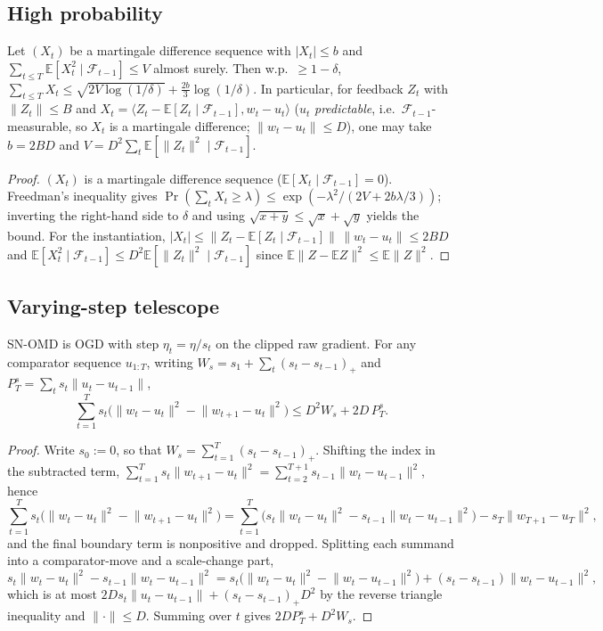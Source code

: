 \documentclass{article}
\newcommand{\E}{\mathbb{E}}
\newcommand{\ip}[2]{\langle #1, #2 \rangle}
\newcommand{\norm}[1]{\lVert #1 \rVert}
\begin{document}
\subsection{High probability}
\begin{lemma}
\label{lem:freedman}
Let $(X_t)$ be a martingale difference sequence with $|X_t|\le b$ and
$\sum_{t\le T}\E[X_t^2\mid\mathcal F_{t-1}]\le V$ almost surely. Then w.p.\ $\ge1-\delta$,
$\sum_{t\le T}X_t\le\sqrt{2V\log(1/\delta)}+\tfrac{2b}{3}\log(1/\delta)$. In particular,
for feedback $Z_t$ with $\norm{Z_t}\le B$ and $X_t=\ip{Z_t-\E[Z_t\mid\mathcal F_{t-1}]}
{w_t-u_t}$ ($u_t$ \emph{predictable}, i.e.\ $\mathcal F_{t-1}$-measurable, so $X_t$ is a
martingale difference; $\norm{w_t-u_t}\le D$), one may take $b=2BD$ and
$V=D^2\sum_t\E[\norm{Z_t}^2\mid\mathcal F_{t-1}]$.
\end{lemma}
\begin{proof}

$(X_t)$ is a martingale difference sequence ($\E[X_t\mid\mathcal F_{t-1}]=0$).
Freedman's inequality gives $\Pr(\sum_t X_t\ge\lambda)\le\exp(-\lambda^2/(2V+2b\lambda/3))$;
inverting the right-hand side to $\delta$ and using $\sqrt{x+y}\le\sqrt x+\sqrt y$ yields
the bound. For the instantiation, $|X_t|\le\norm{Z_t-\E[Z_t\mid\mathcal F_{t-1}]}\,
\norm{w_t-u_t}\le2BD$ and $\E[X_t^2\mid\mathcal F_{t-1}]\le D^2\E[\norm{Z_t}^2\mid
\mathcal F_{t-1}]$ since $\E\norm{Z-\E Z}^2\le\E\norm Z^2$.
\end{proof}

\subsection{Varying-step telescope}
\begin{lemma}
\label{lem:telescope}
SN-OMD is OGD with step $\eta_t=\eta/s_t$ on the clipped raw gradient. For any
comparator sequence $u_{1:T}$, writing $W_s=s_1+\sum_t(s_t-s_{t-1})_+$ and
$P_T^s=\sum_t s_t\norm{u_t-u_{t-1}}$,
\[
\sum_{t=1}^T s_t\bigl(\norm{w_t-u_t}^2-\norm{w_{t+1}-u_t}^2\bigr)\le D^2W_s+2D\,P_T^s.
\]
\end{lemma}
\begin{proof}
Write $s_0:=0$, so that $W_s=\sum_{t=1}^T(s_t-s_{t-1})_+$. Shifting the index in the
subtracted term, $\sum_{t=1}^T s_t\norm{w_{t+1}-u_t}^2=\sum_{t=2}^{T+1}s_{t-1}
\norm{w_t-u_{t-1}}^2$, hence
\[
\sum_{t=1}^T s_t\bigl(\norm{w_t-u_t}^2-\norm{w_{t+1}-u_t}^2\bigr)
=\sum_{t=1}^T\bigl(s_t\norm{w_t-u_t}^2-s_{t-1}\norm{w_t-u_{t-1}}^2\bigr)
 -s_T\norm{w_{T+1}-u_T}^2,
\]
and the final boundary term is nonpositive and dropped. Splitting each summand into a
comparator-move and a scale-change part,
\[
s_t\norm{w_t-u_t}^2-s_{t-1}\norm{w_t-u_{t-1}}^2
=s_t\bigl(\norm{w_t-u_t}^2-\norm{w_t-u_{t-1}}^2\bigr)+(s_t-s_{t-1})\norm{w_t-u_{t-1}}^2,
\]
which is at most $2D s_t\norm{u_t-u_{t-1}}+(s_t-s_{t-1})_+D^2$ by the reverse triangle
inequality and $\norm{\cdot}\le D$. Summing over $t$ gives $2D P_T^s+D^2 W_s$.
\end{proof}
\end{document}
